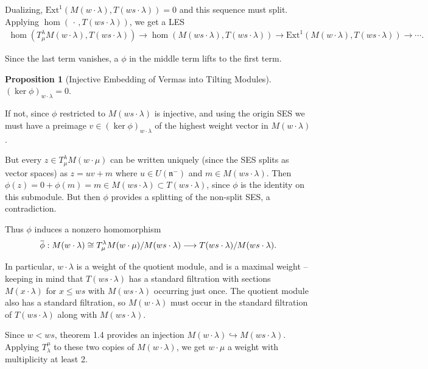 \documentclass[11pt]{scrartcl}
\theoremstyle{definition}
\theoremstyle{theorem}
\newtheorem{proposition}[theorem]{Proposition}
\theoremstyle{proof}
\newenvironment{proof}
{\pushQED{$\qed$}\pf}
{\par\popQED\endpf}
\theoremstyle{definition}
\theoremstyle{break}
\theoremstyle{problem}
\newcommand{\ext}[0]{\text{Ext}}
\newcommand{\injects}[0]{\hookrightarrow}
\newcommand{\lien}[0]{{\mathfrak{n}}}
\newcommand{\wait}[0]{{\,\cdot\,}}
\renewcommand{\bar}[1]{\mkern 1.5mu\overline{\mkern-1.5mu#1\mkern-1.5mu}\mkern 1.5mu}
\renewcommand{\qed}[0]{\hfill\blacksquare}
\renewcommand{\to}[0]{\longrightarrow}
\begin{document}
Dualizing, \(\ext^1(M(w\cdot \lambda), T(ws\cdot \lambda)) = 0\) and
this sequence must split. Applying \(\hom(\wait, T(ws\cdot \lambda))\),
we get a LES \begin{align*}
\hom(T_\mu^\lambda M(w\cdot \lambda), T(ws\cdot \lambda)) \to \hom(M(ws\cdot \lambda), T(ws\cdot \lambda)) \to \ext^1(M(w\cdot \lambda), T(ws\cdot\lambda)) \to \cdots
.\end{align*}

Since the last term vanishes, a \(\phi\) in the middle term lifts to the
first term.

\begin{proposition}[Injective Embedding of Vermas into Tilting Modules]

\((\ker\phi)_{w\cdot \lambda} = 0\).\end{proposition}

\begin{proof}

If not, since \(\phi\) restricted to \(M(ws\cdot \lambda)\) is
injective, and using the origin SES we must have a preimage
\(v\in (\ker \phi)_{w\cdot \lambda}\) of the highest weight vector in
\(M(w\cdot \lambda)\).

But every \(z\in T_\mu^\lambda M(w\cdot \mu)\) can be written uniquely
(since the SES splits as vector spaces) as \(z = uv + m\) where
\(u\in U(\lien^-)\) and \(m\in M(ws\cdot \lambda)\). Then
\(\phi(z) = 0 + \phi(m) = m \in M(ws\cdot \lambda) \subset T(ws\cdot\lambda)\),
since \(\phi\) is the identity on this submodule. But then \(\phi\)
provides a splitting of the non-split SES, a contradiction.\end{proof}

Thus \(\phi\) induces a nonzero homomorphism \begin{align*}
\bar \phi : M(w\cdot \lambda) \cong T_\mu^\lambda M(w\cdot \mu) / M(ws\cdot \lambda) \to T(ws\cdot \lambda) / M(ws\cdot \lambda)
.\end{align*}

In particular, \(w\cdot \lambda\) is a weight of the quotient module,
and is a maximal weight -- keeping in mind that \(T(ws\cdot \lambda)\)
has a standard filtration with sections \(M(x\cdot \lambda)\) for
\(x \leq ws\) with \(M(ws\cdot \lambda)\) occurring just once. The
quotient module also has a standard filtration, so \(M(w\cdot \lambda)\)
must occur in the standard filtration of \(T(ws\cdot \lambda)\) along
with \(M(ws\cdot \lambda)\).

Since \(w<ws\), theorem 1.4 provides an injection
\(M(w\cdot \lambda) \injects M(ws\cdot \lambda)\). Applying
\(T_\lambda^\mu\) to these two copies of \(M(w\cdot \lambda)\), we get
\(w\cdot \mu\) a weight with multiplicity at least 2.
\end{document}
